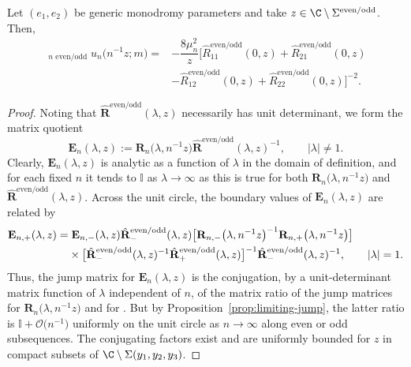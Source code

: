 \begin{Lemma}
\label{lemma:limit}
Let $(e_1, e_2)$ be generic monodromy parameters and take $z \in \C \setminus \Sigma^\mathrm{even/odd}$. Then,
\begin{align}
 \mathop{\lim_{n\to\infty}}_{\text{$n$ even/odd}}u_n\big(n^{-1}z;m\big)={}&-\dfrac{8 \mu_n^2}{z}\big[\hat{R}_{11}^\mathrm{even/odd}(0,z)+\hat{R}_{21}^\mathrm{even/odd}(0,z)\nonumber\\
 &-\hat{R}_{12}^\mathrm{even/odd}(0,z)+\hat{R}_{22}^\mathrm{even/odd}(0,z)\big]^{-2}.\label{eq:un-Rhat}
\end{align}
\end{Lemma}
\begin{proof}

Noting that $\hat{\mathbf{R}}^\mathrm{even/odd}(\lambda,z)$ necessarily has unit determinant, we form the matrix quotient
\begin{equation*}
 \mathbf{E}_n(\lambda,z):=\mathbf{R}_n\big(\lambda,n^{-1}z\big)\hat{\mathbf{R}}^\mathrm{even/odd}(\lambda,z)^{-1},\qquad |\lambda|\neq 1.
\end{equation*}
Clearly, $\mathbf{E}_n(\lambda,z)$ is analytic as a function of $\lambda$ in the domain of definition, and for each fixed $n$ it tends to $\mathbb{I}$ as $\lambda\to\infty$ as this is true for both $\mathbf{R}_n\big(\lambda,n^{-1}z\big)$ and $\hat{\mathbf{R}}^\mathrm{even/odd}(\lambda,z)$. Across the unit circle, the boundary values of $\mathbf{E}_n(\lambda,z)$ are related by
\begin{align*}
 &\mathbf{E}_{n,+}(\lambda,z)= \mathbf{E}_{n,-}(\lambda,z)\hat{\mathbf{R}}_-^\mathrm{even/odd}(\lambda,z)\big[\mathbf{R}_{n,-}\big(\lambda,n^{-1}z\big)^{-1}\mathbf{R}_{n,+}\big(\lambda,n^{-1}z\big)\big]\\
 &\hphantom{\mathbf{E}_{n,+}(\lambda,z)=}{}
 \times \big[\hat{\mathbf{R}}^\mathrm{even/odd}_-(\lambda,z)^{-1}\hat{\mathbf{R}}^\mathrm{even/odd}_+(\lambda,z)\big]^{-1}
 \hat{\mathbf{R}}^\mathrm{even/odd}_-(\lambda,z)^{-1},\qquad |\lambda|=1.
\end{align*}
Thus, the jump matrix for $\mathbf{E}_n(\lambda,z)$ is the conjugation, by a unit-determinant matrix function of $\lambda$ independent of $n$, of the matrix ratio of the jump matrices for $\mathbf{R}_n\big(\lambda,n^{-1}z\big)$ and for . But by Proposition~\ref{prop:limiting-jump}, the latter ratio is $\mathbb{I}+\mathcal{O}\big(n^{-1}\big)$ uniformly on the unit circle as $n\to\infty$ along even or odd subsequences. The conjugating factors exist and are uniformly bounded for $z$ in compact subsets of $\C\setminus \Sigma(y_1, y_2, y_3)$. %

\end{proof}
